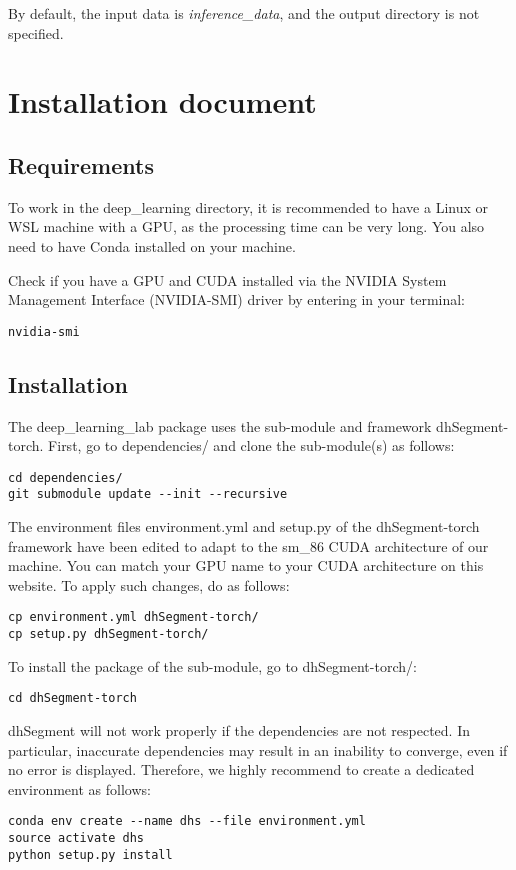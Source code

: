 \documentclass{polytech/polytech}
\numberwithin{figure}{chapter}
\begin{document}
\begin{appendix}
By default, the input data is {\it inference_data}, and the output directory is not specified.


\chapter{Installation document}

\section{Requirements}
To work in the deep_learning directory, it is recommended to have a Linux or WSL machine with a GPU, as the processing time can be very long. You also need to have Conda installed on your machine.

Check if you have a GPU and CUDA installed via the NVIDIA System Management Interface (NVIDIA-SMI) driver by entering in your terminal:
\begin{verbatim}
nvidia-smi
\end{verbatim}

\section{Installation}
The deep_learning_lab package uses the sub-module and framework dhSegment-torch. First, go to dependencies/ and clone the sub-module(s) as follows:
\begin{verbatim}
cd dependencies/
git submodule update --init --recursive
\end{verbatim}

The environment files environment.yml and setup.py of the dhSegment-torch framework have been edited to adapt to the sm_86 CUDA architecture of our machine. You can match your GPU name to your CUDA architecture on this website. To apply such changes, do as follows:
\begin{verbatim}
cp environment.yml dhSegment-torch/
cp setup.py dhSegment-torch/
\end{verbatim}

To install the package of the sub-module, go to dhSegment-torch/:
\begin{verbatim}
cd dhSegment-torch
\end{verbatim}

dhSegment will not work properly if the dependencies are not respected.
In particular, inaccurate dependencies may result in an inability to converge, even if no error is displayed.
Therefore, we highly recommend to create a dedicated environment as follows:
\begin{verbatim}
conda env create --name dhs --file environment.yml
source activate dhs
python setup.py install
\end{verbatim}


\end{appendix}
\end{document}
